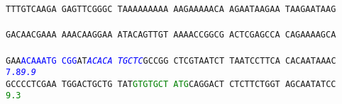\documentclass[11pt,twoside,reqno,a4paper]{article}
\begin{document}
\texttt{TTTGTCAAGA	GAGTTCGGGC	TAAAAAAAAA	AAGAAAAACA	AGAATAAGAA	TAAGAATAAG	\\
\hspace*{1\charwidth}\hspace*{1\charwidth}\hspace*{1\charwidth}\hspace*{1\charwidth}\hspace*{1\charwidth}\hspace*{1\charwidth}\\
GACAACGAAA	AAACAAGGAA	ATACAGTTGT	AAAACCGGCG	ACTCGAGCCA	CAGAAAAGCA	\\
\hspace*{1\charwidth}\hspace*{1\charwidth}\hspace*{1\charwidth}\hspace*{1\charwidth}\hspace*{1\charwidth}\hspace*{1\charwidth}\\
GAA\textcolor{Blue}{A}\textcolor{Blue}{C}\textcolor{Blue}{A}\textcolor{Blue}{A}\textcolor{Blue}{A}\textcolor{Blue}{T}\textcolor{Blue}{G}	\textcolor{Blue}{C}\textcolor{Blue}{G}\textcolor{Blue}{G}AT\textit{\textcolor{Blue}{A}}\textit{\textcolor{Blue}{C}}\textit{\textcolor{Blue}{A}}\textit{\textcolor{Blue}{C}}\textit{\textcolor{Blue}{A}}	\textit{\textcolor{Blue}{T}}\textit{\textcolor{Blue}{G}}\textit{\textcolor{Blue}{C}}\textit{\textcolor{Blue}{T}}\textit{\textcolor{Blue}{C}}GCCGG	CTCGTAATCT	TAATCCTTCA	CACAATAAAC	\\
\hspace*{3\charwidth}\textcolor{Blue}{7.8}\hspace*{1\charwidth}\hspace*{-44\charwidth}\textit{\textcolor{Blue}{9.9}}\hspace*{1\charwidth}\hspace*{1\charwidth}\hspace*{1\charwidth}\hspace*{1\charwidth}\hspace*{1\charwidth}\hspace*{1\charwidth}\\
GCCCCTCGAA	TGGACTGCTG	TAT\textcolor{Green}{G}\textcolor{Green}{T}\textcolor{Green}{G}\textcolor{Green}{T}\textcolor{Green}{G}\textcolor{Green}{C}\textcolor{Green}{T}	\textcolor{Green}{A}\textcolor{Green}{T}\textcolor{Green}{G}CAGGACT	CTCTTCTGGT	AGCAATATCC	\\
\hspace*{1\charwidth}\hspace*{1\charwidth}\hspace*{23\charwidth}\textcolor{Green}{9.3}\hspace*{1\charwidth}\hspace*{1\charwidth}\hspace*{1\charwidth}\hspace*{1\charwidth}\\
}
\end{document}
